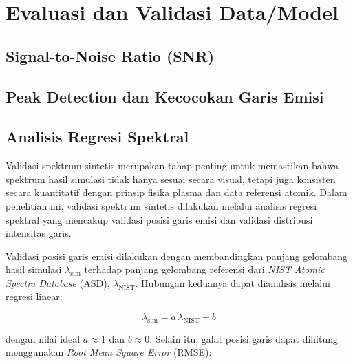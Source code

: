 \section{Evaluasi dan Validasi Data/Model}

\subsection{Signal-to-Noise Ratio (SNR)}

\subsection{Peak Detection dan Kecocokan Garis Emisi}

\subsection{Analisis Regresi Spektral}

Validasi spektrum sintetis merupakan tahap penting untuk memastikan bahwa spektrum hasil simulasi tidak hanya sesuai secara visual, tetapi juga konsisten secara kuantitatif dengan prinsip fisika plasma dan data referensi atomik. Dalam penelitian ini, validasi spektrum sintetis dilakukan melalui analisis regresi spektral yang mencakup validasi posisi garis emisi dan validasi distribusi intensitas garis.

Validasi posisi garis emisi dilakukan dengan membandingkan panjang gelombang hasil simulasi $\lambda_{\mathrm{sim}}$ terhadap panjang gelombang referensi dari \textit{NIST Atomic Spectra Database} (ASD), $\lambda_{\mathrm{NIST}}$. Hubungan keduanya dapat dianalisis melalui regresi linear:

\begin{equation}
\lambda_{\mathrm{sim}} = a\,\lambda_{\mathrm{NIST}} + b
\end{equation}

dengan nilai ideal $a \approx 1$ dan $b \approx 0$. Selain itu, galat posisi garis dapat dihitung menggunakan \textit{Root Mean Square Error} (RMSE):

